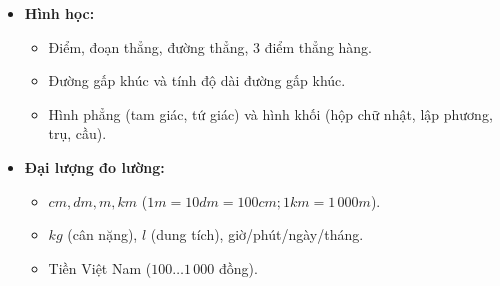 \documentclass[10pt,a4paper]{article}
\begin{document}
\begin{minipage}[t]{0.49\textwidth}\vspace{0pt}
\begin{tcolorbox}[
  enhanced,
  colback=teal!4!white,
  colframe=teal!75!black,
  arc=2mm, boxrule=0.8pt,
  left=2mm, right=2mm, top=1.8mm, bottom=1.8mm,
  title={\footnotesize\bfseries\color{white}\faSliders\ 2. Trụ cột 2: Hình học và Đo lường}
]
{\footnotesize
\begin{itemize}\setlength{\itemsep}{1pt}\setlength{\leftskip}{-2.5mm}
  \item \textbf{Hình học:}
  \begin{itemize}\setlength{\itemsep}{0.5pt}\setlength{\leftskip}{-2mm}
    \item Điểm, đoạn thẳng, đường thẳng, 3 điểm thẳng hàng.
    \item Đường gấp khúc và tính độ dài đường gấp khúc.
    \item Hình phẳng (tam giác, tứ giác) và hình khối (hộp chữ nhật, lập phương, trụ, cầu).
  \end{itemize}
  \item \textbf{Đại lượng đo lường:}
  \begin{itemize}\setlength{\itemsep}{0.5pt}\setlength{\leftskip}{-2mm}
    \item $cm, dm, m, km$ ($1m = 10dm = 100cm; 1km = 1\,000m$).
    \item $kg$ (cân nặng), $l$ (dung tích), giờ/phút/ngày/tháng.
    \item Tiền Việt Nam ($100 \dots 1\,000$ đồng).
  \end{itemize}
\end{itemize}
}
\end{tcolorbox}
\end{minipage}
\end{document}
